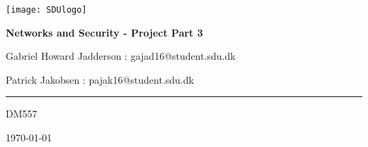 \begin{titlepage}
	\centering
	\texttt{[image: SDUlogo]}\par\vspace{0.5cm} %
	{\huge\bfseries Networks and Security - Project Part 3\par}
	\vspace{0.5cm}
	{\small Gabriel Howard Jadderson : gajad16@student.sdu.dk\par}
	{\small Patrick Jakobsen : pajak16@student.sdu.dk\par}
  {\rule{10.0cm}{0.1mm}\par}
	{\small DM557\par}
	{\small \today\par}
	\vspace{1cm}
\end{titlepage}

